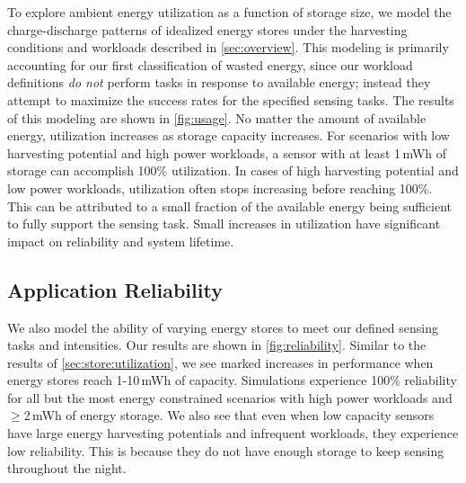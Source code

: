To explore ambient energy utilization as a function of storage size, we
model the charge-discharge patterns of idealized energy stores under
the harvesting conditions and workloads described in \cref{sec:overview}.
This modeling is primarily accounting for our first classification of
wasted energy, since our workload definitions \textit{do not} perform
tasks in response to available energy; instead they attempt to maximize the success
rates for the specified sensing tasks.
The results of this modeling are shown in \cref{fig:usage}. No matter
the amount of available energy, utilization increases as
storage capacity increases. For scenarios with low harvesting potential and high
power workloads, a sensor with at least 1\,mWh of storage can accomplish 100\% utilization.
In cases of
high harvesting potential and low power workloads, utilization often
stops increasing before reaching 100\%. This
can be attributed to a small fraction of the available energy being sufficient
to fully support the sensing task.
Small increases in utilization
have significant impact on reliability and system lifetime.

\subsection{Application Reliability}
\label{sec:store:reliability}

We also model the ability of varying energy stores to meet our defined
sensing tasks and intensities. Our results are
shown in \cref{fig:reliability}. %
Similar to the results of \cref{sec:store:utilization}, we see marked
increases in performance when energy stores reach 1-10\,mWh
of capacity.
Simulations experience 100\% reliability for all but
the most energy constrained scenarios with high power workloads and
$\geq$2\,mWh of energy storage.
We also see that even when low capacity sensors
have large energy harvesting potentials and infrequent workloads, they experience low
reliability.
This is because they
do not have enough storage to keep sensing throughout the night.

